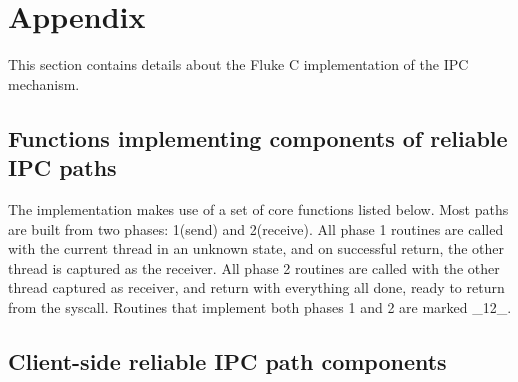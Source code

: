 \section{Appendix}
This section contains details about the Fluke C implementation of the
IPC mechanism.

\subsection{Functions implementing components of reliable IPC
  paths}
 
The implementation makes use of a set of core functions
listed below.
Most paths are built from two phases: 1(send) and 2(receive).
All phase 1 routines are called with the current thread in an unknown
state, and on successful return, the other thread is captured as the
receiver. All phase 2 routines are called with the other thread
captured as receiver, and return with everything all done, ready to
return from the syscall. Routines that implement both phases 1 and 2
are marked _12_.

\subsection{Client-side reliable IPC path components}

